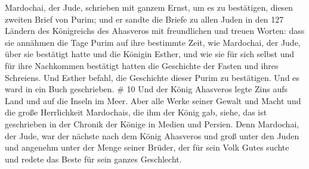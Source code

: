 Mardochai, der Jude, schrieben mit ganzem Ernst, um es zu bestätigen,
diesen zweiten Brief von Purim;  und er sandte die Briefe
zu allen Juden in den 127 Ländern des Königreichs des Ahasveros mit
freundlichen und treuen Worten:  dass sie annähmen die Tage
Purim auf ihre bestimmte Zeit, wie Mardochai, der Jude, über sie
bestätigt hatte und die Königin Esther, und wie sie für sich selbst und
für ihre Nachkommen bestätigt hatten die Geschichte der Fasten und ihres
Schreiens.  Und Esther befahl, die Geschichte dieser Purim
zu bestätigen. Und es ward in ein Buch geschrieben. \# 10 
Und der König Ahasveros legte Zins aufs Land und auf die Inseln im Meer.
 Aber alle Werke seiner Gewalt und Macht und die große
Herrlichkeit Mardochais, die ihm der König gab, siehe, das ist
geschrieben in der Chronik der Könige in Medien und Persien.
 Denn Mardochai, der Jude, war der nächste nach dem König
Ahasveros und groß unter den Juden und angenehm unter der Menge seiner
Brüder, der für sein Volk Gutes suchte und redete das Beste für sein
ganzes Geschlecht.
